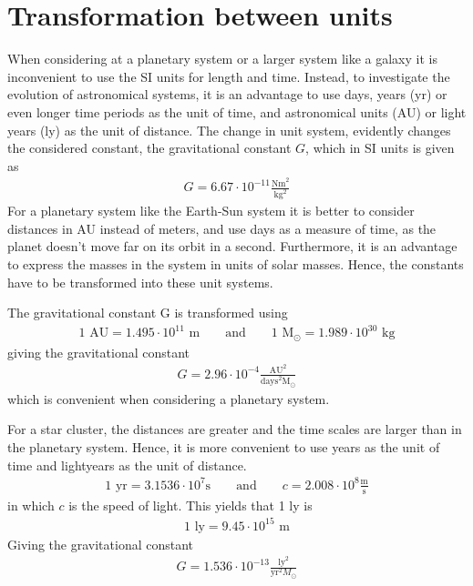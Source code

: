 \section{Transformation between units}
\label{sec:Conversion}
When considering at a planetary system or a larger system like a galaxy it is inconvenient to use the SI units for length and time.
Instead, to investigate the evolution of astronomical systems, it is an advantage to use days, years (yr) or even longer time periods as the unit of time, and astronomical units (AU) or light years (ly) as the unit of distance.
The change in unit system, evidently changes the considered constant, the gravitational constant $G$, which in SI units is given as
\begin{align}
	G = 6.67\cdot 10^{-11} \frac{\textrm{Nm}^2}{\textrm{kg}^2}
\end{align}
For a planetary system like the Earth-Sun system it is better to consider distances in AU instead of meters, and use days as a measure of time, as the planet doesn't move far on its orbit in a second.
Furthermore, it is an advantage to express the masses in the system in units of solar masses. 
Hence, the constants have to be transformed into these unit systems. 

The gravitational constant G is transformed using
\begin{align}
	1 \textrm{ AU} = 1.495\cdot10^{11} \textrm{ m}
	\qquad \text{and} \qquad
	1 \textrm{ M}_{\odot} = 1.989 \cdot 10^{30} \textrm{ kg}
\end{align}
giving the gravitational constant
\begin{align}
	G = 2.96\cdot 10^{-4} \frac{\textrm{AU}^2}{\textrm{days}^2 \textrm{M}_{\odot}}
\end{align}
which is convenient when considering a planetary system.
 
For a star cluster, the distances are greater and the time scales are larger than in the planetary system.
Hence, it is more convenient to use years as the unit of time and lightyears as the unit of distance. 
\begin{align}
	1 \textrm{ yr} = 3.1536\cdot10^7\textrm{s}
	\qquad \text{and} \qquad
	c = 2.008\cdot 10^8 \frac{\textrm{m}}{\textrm{s}}
\end{align}
in which $c$ is the speed of light.
This yields that 1 ly is
\begin{align}
	1 \textrm{ ly} = 9.45 \cdot 10^15 \textrm{ m}
\end{align}
Giving the gravitational constant
\begin{align}
	G = 1.536\cdot 10^{-13} \frac{\textrm{ly}^2}{\textrm{yr}^2 {M}_{\odot}}
\end{align}


